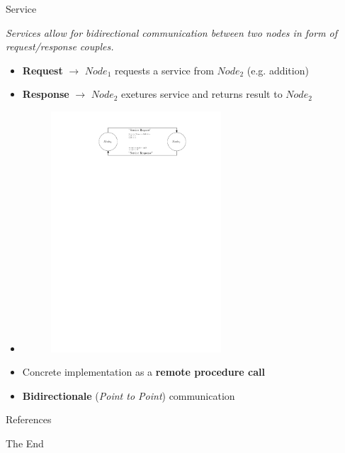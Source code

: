 \documentclass{beamer}
\begin{document}
\begin{frame}{Service}
 \begin{definition}[Service]
 \textit{Services allow for bidirectional communication between two nodes in form of request/response couples.}
 \end{definition}
 \begin{itemize}
  \item \textbf{Request} $\rightarrow$ $Node_1$ requests a service from $Node_2$ (e.g. addition)
  \item \textbf{Response} $\rightarrow$ $Node_2$ exetures service and returns result to $Node_2$
  \item 
   \begin{figure}[H]
    \centering
    \includegraphics[width=0.6\textwidth]{ros-service.pdf}
    \label{fig:ros_service}
   \end{figure}
   \item Concrete implementation as a \textbf{remote procedure call}
   \item \textbf{Bidirectionale} (\textit{Point to Point}) communication
  \end{itemize}
\end{frame}
\begin{frame}[allowframebreaks]{References}
\scriptsize{}
\end{frame}
\begin{frame}
\Huge{\centerline{The End}}
\end{frame}
\end{document}

